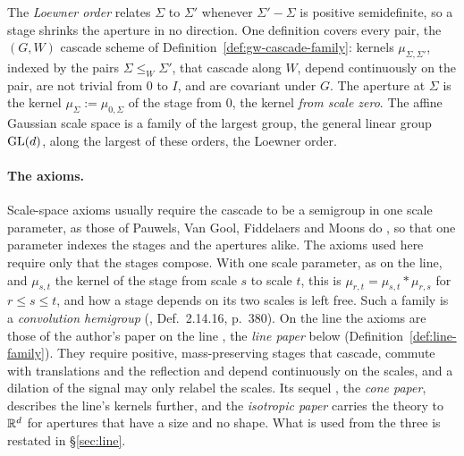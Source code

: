 The \emph{Loewner order} relates $\Sigma$ to $\Sigma'$ whenever $\Sigma' - \Sigma$ is positive
semidefinite, so a stage shrinks the aperture in no direction. One definition covers every pair, the
$(G, W)$ cascade scheme of Definition~\ref{def:gw-cascade-family}: kernels $\mu_{\Sigma,\Sigma'}$,
indexed by the pairs $\Sigma \le_W \Sigma'$, that cascade along $W$, depend continuously on the pair,
are not trivial from $0$ to $I$, and are covariant under $G$. The aperture at $\Sigma$ is the kernel
$\mu_\Sigma := \mu_{0,\Sigma}$ of the stage from $0$, the kernel \emph{from scale zero}. The affine Gaussian scale space is a family of the
largest group, the general linear group $\mathrm{GL}(d)$, along the largest of these orders, the Loewner
order.

\paragraph{The axioms.} Scale-space axioms usually require the cascade to be a semigroup in one scale parameter, as those of
Pauwels, Van Gool, Fiddelaers and Moons do , so that one parameter indexes
the stages and the apertures alike. The axioms used here require only that the stages compose. With one
scale parameter, as on the line, and $\mu_{s,t}$ the kernel of the stage from scale $s$ to scale $t$,
this is
$\mu_{r,t} = \mu_{s,t} * \mu_{r,s}$ for $r \le s \le t$, and how a stage depends on its two scales is
left free. Such a family is a \emph{convolution hemigroup} (, Def.~2.14.16,
p.~380). On the line the axioms are those of the author's paper on the line
, the \emph{line paper} below (Definition~\ref{def:line-family}). They
require positive, mass-preserving stages that cascade, commute with translations and the reflection
and depend continuously on the scales, and a dilation of the signal may only relabel the scales. Its
sequel , the \emph{cone paper}, describes the line's kernels further,
and the \emph{isotropic paper}  carries the theory to $\mathbb{R}^d$ for
apertures that have a size and no shape. What is used from the three is restated in
\S\ref{sec:line}.

